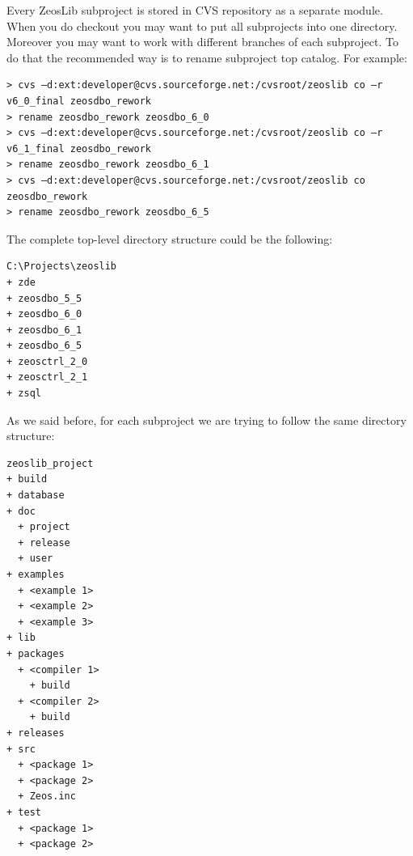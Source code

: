\documentclass[a4paper,12pt,oneside]{book}
\begin{document}
Every ZeosLib subproject is stored in CVS repository as a separate module.
When you do checkout you may want to put all subprojects into one directory.
Moreover you may want to work with different branches of each subproject.
To do that the recommended way is to rename subproject top catalog.
For example:
\begin{verbatim}
> cvs –d:ext:developer@cvs.sourceforge.net:/cvsroot/zeoslib co –r v6_0_final zeosdbo_rework
> rename zeosdbo_rework zeosdbo_6_0
> cvs –d:ext:developer@cvs.sourceforge.net:/cvsroot/zeoslib co –r v6_1_final zeosdbo_rework
> rename zeosdbo_rework zeosdbo_6_1
> cvs –d:ext:developer@cvs.sourceforge.net:/cvsroot/zeoslib co zeosdbo_rework
> rename zeosdbo_rework zeosdbo_6_5
\end{verbatim}

The complete top-level directory structure could be the following:
\begin{verbatim}
C:\Projects\zeoslib
+ zde
+ zeosdbo_5_5
+ zeosdbo_6_0
+ zeosdbo_6_1
+ zeosdbo_6_5
+ zeosctrl_2_0
+ zeosctrl_2_1
+ zsql
\end{verbatim}

As we said before, for each subproject we are trying to follow the same directory structure:
\begin{verbatim}
zeoslib_project
+ build
+ database
+ doc
  + project
  + release
  + user
+ examples
  + <example 1>
  + <example 2>
  + <example 3>
+ lib
+ packages
  + <compiler 1>
    + build
  + <compiler 2>
    + build
+ releases
+ src
  + <package 1>
  + <package 2>
  + Zeos.inc
+ test
  + <package 1>
  + <package 2>
\end{verbatim}
\end{document}
